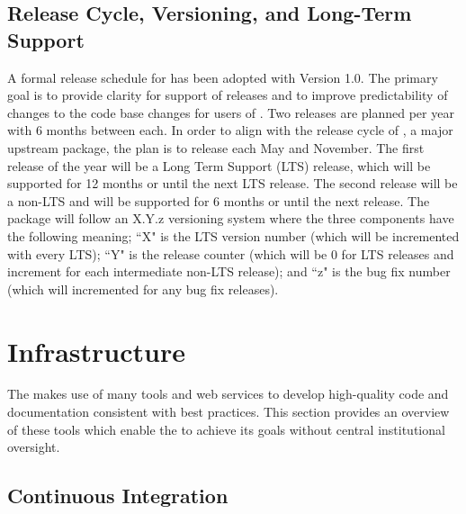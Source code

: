 \subsection{Release Cycle, Versioning, and Long-Term Support}
\label{sec:release}

A formal release schedule for \sunpypkg has been adopted with Version 1.0.
The primary goal is to provide clarity for support of releases and to improve predictability of changes to the code base changes for users of \sunpypkg.
Two releases are planned per year with 6 months between each.
In order to align with the release cycle of \astropypkg, a major upstream package, the plan is to release each May and November.
The first release of the year will be a Long Term Support (LTS) release, which will be supported for 12 months or until the next LTS release.
The second release will be a non-LTS and will be supported for 6 months or until the next release.
The \sunpypkg package will follow an X.Y.z versioning system where the three components have the following meaning;
``X" is the LTS version number (which will be incremented with every LTS);
``Y" is the release counter (which will be 0 for LTS releases and increment for each intermediate non-LTS release);
and ``z" is the bug fix number (which will incremented for any bug fix releases).

\section{Infrastructure}
\label{sec:infrastructure}

The \sunpyproj makes use of many tools and web services to develop high-quality code and documentation consistent with best practices.
This section provides an overview of these tools which enable the \sunpyproj to achieve its goals without central institutional oversight.

\subsection{Continuous Integration}
\label{sec:continuous-integration}

